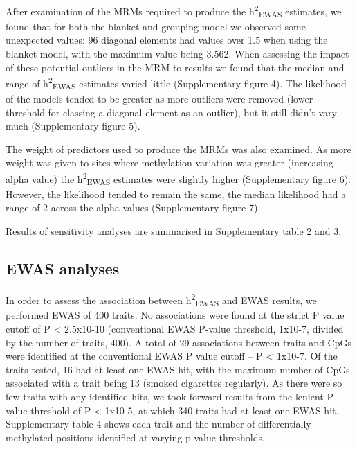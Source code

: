\documentclass[11pt,oneside]{bristolthesis}
\begin{document}
After examination of the MRMs required to produce the h\textsuperscript{2}\textsubscript{EWAS} estimates, we found that for both the blanket and grouping model we observed some unexpected values: 96 diagonal elements had values over 1.5 when using the blanket model, with the maximum value being 3.562. When assessing the impact of these potential outliers in the MRM to results we found that the median and range of h\textsuperscript{2}\textsubscript{EWAS} estimates varied little (Supplementary figure 4). The likelihood of the models tended to be greater as more outliers were removed (lower threshold for classing a diagonal element as an outlier), but it still didn't vary much (Supplementary figure 5).

The weight of predictors used to produce the MRMs was also examined. As more weight was given to sites where methylation variation was greater (increasing alpha value) the h\textsuperscript{2}\textsubscript{EWAS} estimates were slightly higher (Supplementary figure 6). However, the likelihood tended to remain the same, the median likelihood had a range of 2 across the alpha values (Supplementary figure 7).

Results of sensitivity analyses are summarised in Supplementary table 2 and 3.

\hypertarget{results-ewas-analyses-05}{%
\subsection{EWAS analyses}\label{results-ewas-analyses-05}}

In order to assess the association between h\textsuperscript{2}\textsubscript{EWAS} and EWAS results, we performed EWAS of 400 traits. No associations were found at the strict P value cutoff of P \textless{} 2.5x10-10 (conventional EWAS P-value threshold, 1x10-7, divided by the number of traits, 400). A total of 29 associations between traits and CpGs were identified at the conventional EWAS P value cutoff -- P \textless{} 1x10-7. Of the traits tested, 16 had at least one EWAS hit, with the maximum number of CpGs associated with a trait being 13 (smoked cigarettes regularly). As there were so few traits with any identified hits, we took forward results from the lenient P value threshold of P \textless{} 1x10-5, at which 340 traits had at least one EWAS hit. Supplementary table 4 shows each trait and the number of differentially methylated positions identified at varying p-value thresholds.
\end{document}
